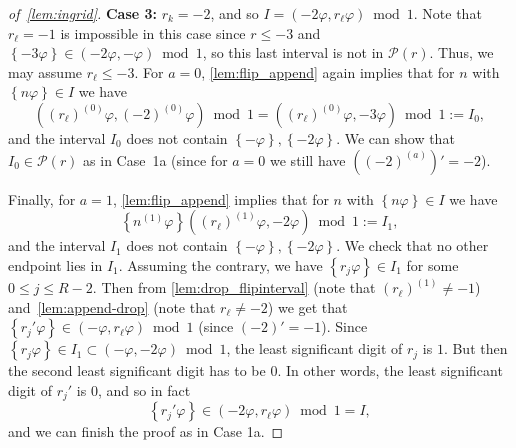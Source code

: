\documentclass[12pt,runningheads]{llncs}
\newcommand{\cP}{\mathcal{P}}
\renewcommand{\phi}{\varphi}
\newcommand{\fract}[1]{\left\{ #1 \right\}}
\newcommand{\none}{n^{(1)}}
\newcommand{\append}[2]{#1^{(#2)}}
\newcommand{\caseI}[1]{\medskip\noindent\textbf{Case #1:}}
\begin{document}
\begin{proof}[of~\cref{lem:ingrid}]
\caseI{3} $r_k=-2$, and so $I = (-2 \phi, r_\ell \phi) \bmod 1$. Note that $r_\ell = -1$ is impossible in this case since $r\leq -3$ and $\fract{-3\phi} \in (-2\phi, -\phi)\bmod 1$, so this last interval is not in $\cP(r)$.
Thus, we may assume $r_\ell \leq -3$. 
For $a=0$, \cref{lem:flip_append} again implies that for $n$ with $\fract{n\phi} \in I$ we have
\[
    (\append{(r_\ell)}{0} \phi, \append{(-2)}{0} \phi)\bmod 1
    =(\append{(r_\ell)}{0} \phi, -3\phi)\bmod 1
    := I_0,
\]
and the interval $I_0$ does not contain $\fract{-\phi}, \fract{-2\phi}$. We can show that $I_0 \in \cP(r)$ as in Case~1a (since for $a=0$ we still have $(\append{(-2)}{a})' = -2$).

Finally, for $a = 1$, \cref{lem:flip_append} implies that for $n$ with $\fract{n\phi} \in I$ we have
\[
    \fract{\none \phi}
    (\append{(r_\ell)}{1} \phi, -2\phi) \bmod 1
    :=I_1,
\] 
and the interval $I_1$ does not contain $\fract{-\phi}, \fract{-2\phi}$.
We check that no other endpoint lies in $I_1$.
Assuming the contrary, we have $\fract{r_j\phi} \in I_1$ for some $0\leq j\leq R-2$. Then from \cref{lem:drop_flipinterval} (note that $\append{(r_\ell)}{1}\neq -1$) and~\cref{lem:append-drop} (note that $r_\ell \neq -2$) we get that $\fract{r_j'\phi} \in (-\phi, r_\ell\phi) \bmod 1$ (since $(-2)'=-1$). 
Since $\fract{r_j\phi} \in I_1 \subset (-\phi,-2\phi)\bmod 1$, the least significant digit of $r_j$ is $1$. But then the second least significant digit has to be $0$. In other words, the least significant digit of $r_j'$ is $0$, and so in fact
\[
    \fract{r_j'\phi} \in (-2\phi, r_\ell\phi)\bmod 1=I,
\]
and we can finish the proof as in Case 1a. 
\end{proof}
\end{document}
